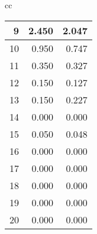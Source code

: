\begin{tabular}{cc}
\begin{tabular}{|r|r|r|}
\hline
9 &  2.450 &  2.047 \\
\hline
10 &  0.950 &  0.747 \\
\hline
11 &  0.350 &  0.327 \\
\hline
12 &  0.150 &  0.127 \\
\hline
13 &  0.150 &  0.227 \\
\hline
14 &  0.000 &  0.000 \\
\hline
15 &  0.050 &  0.048 \\
\hline
16 &  0.000 &  0.000 \\
\hline
17 &  0.000 &  0.000 \\
\hline
18 &  0.000 &  0.000 \\
\hline
19 &  0.000 &  0.000 \\
\hline
20 &  0.000 &  0.000 \\
\hline
\end{tabular} \end{tabular} 